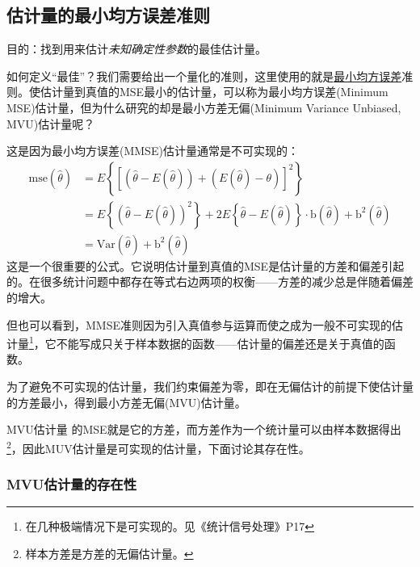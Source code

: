     \subsection{估计量的最小均方误差准则}

        目的：找到用来估计\emph{未知确定性参数}的最佳估计量。

        如何定义“最佳”？我们需要给出一个量化的准则，这里使用的就是\uline{最小均方误差}准则。使估计量到真值的MSE最小的估计量，可以称为最小均方误差(Minimum MSE)估计量，但为什么研究的却是最小方差无偏(Minimum Variance Unbiased, MVU)估计量呢？

        这是因为最小均方误差(MMSE)估计量通常是不可实现的：
        \begin{equation}
            \begin{aligned}
                \mathrm{mse}\left(\hat{\theta}\right)
                &=E\left\{\left[\left(\hat{\theta}-E(\hat{\theta})\right)+\left(E(\hat{\theta})-\theta\right)\right]^2\right\}\\
                &=E\left\{\left(\hat{\theta}-E(\hat{\theta})\right)^2\right\}+2E\left\{\hat{\theta}-E(\hat{\theta})\right\}\cdot \mathrm{b}\left(\hat{\theta}\right)+\mathrm{b}^2\left(\hat{\theta}\right)\\
                &=\mathrm{Var}\left(\hat{\theta}\right)+\mathrm{b}^2\left(\hat{\theta}\right)
            \end{aligned}
        \end{equation}
        这是一个很重要的公式。它说明估计量到真值的MSE是估计量的方差和偏差引起的。在很多统计问题中都存在等式右边两项的权衡——方差的减少总是伴随着偏差的增大。

        但也可以看到，MMSE准则因为引入真值参与运算而使之成为一般不可实现的估计量\footnote[1]{在几种极端情况下是可实现的。见《统计信号处理》P17}，它不能写成只关于样本数据的函数——估计量的偏差还是关于真值的函数。

        为了避免不可实现的估计量，我们约束偏差为零，即在无偏估计的前提下使估计量的方差最小，得到最小方差无偏(MVU)估计量。

        MVU估计量 的MSE就是它的方差，而方差作为一个统计量可以由样本数据得出\footnote[1]{样本方差是方差的无偏估计量。}，因此MUV估计量是可实现的估计量，下面讨论其存在性。

        \subsubsection{MVU估计量的存在性}

